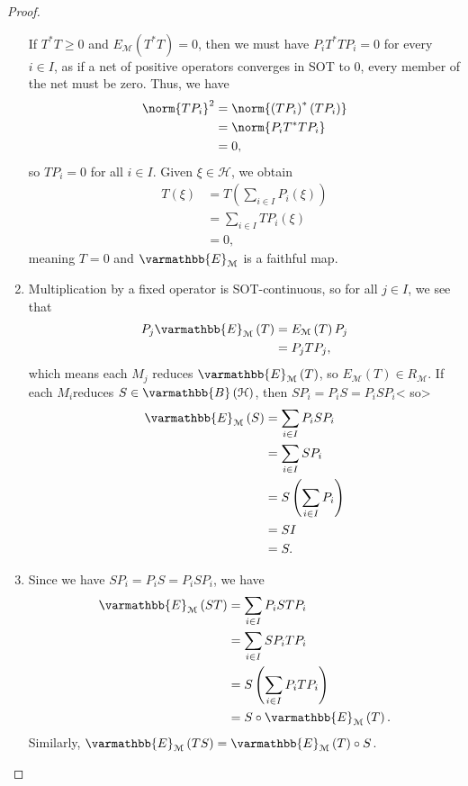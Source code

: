 \documentclass[10pt]{mypackage}
\renewcommand*{\mathbb}[1]{\varmathbb{#1}}
\newcommand{\B}{\mathbb{B}}
\begin{document}
\begin{proof}
\begin{enumerate}[(1)]
      If $T^{\ast}T \geq 0$ and $E_{\mathcal{M}}\left(T^{\ast}T\right) = 0$, then we must have $P_iT^{\ast}TP_i = 0$ for every $i\in I$, as if a net of positive operators converges in SOT to $0$, every member of the net must be zero. Thus, we have
      \begin{align*}
        \norm{TP_i}^2 &= \norm{\left(TP_i\right)^{\ast}\left(TP_i\right)}\\
                      &= \norm{P_iT^{\ast}TP_i}\\
                      &= 0,
      \end{align*}
      so $TP_i = 0$ for all $i\in I$. Given $\xi\in \mathcal{H}$, we obtain
      \begin{align*}
        T\left(\xi\right) &= T\left(\sum_{i\in I}P_i\left(\xi\right)\right)\\
                          &= \sum_{i\in I}TP_i\left(\xi\right)\\
                          &= 0,
      \end{align*}
      meaning $T = 0$ and $\mathbb{E}_{\mathcal{M}}$ is a faithful map.
    \item Multiplication by a fixed operator is SOT-continuous, so for all $j\in I$, we see that
      \begin{align*}
        P_j \mathbb{E}_{\mathcal{M}}\left(T\right) &= E_{\mathcal{M}}\left(T\right)P_{j}\\
                                                   &= P_jTP_j,
      \end{align*}
      which means each $M_j$ reduces $\mathbb{E}_{\mathcal{M}}\left(T\right)$, so $E_{\mathcal{M}}\left(T\right)\in R_{\mathcal{M}}$. If each $M_i$reduces $S\in \B\left(\mathcal{H}\right)$, then $SP_i = P_iS = P_iSP_i$< so>
      \begin{align*}
        \mathbb{E}_{\mathcal{M}}\left(S\right) &= \sum_{i\in I}P_iSP_i\\
                                               &= \sum_{i\in I}SP_i\\
                                               &= S\left(\sum_{i\in I}P_i\right)\\
                                               &= SI\\
                                               &= S.
      \end{align*}
    \item Since we have $SP_i = P_iS = P_iSP_i$, we have
      \begin{align*}
        \mathbb{E}_{\mathcal{M}}\left(ST\right) &= \sum_{i\in I}P_iSTP_i\\
                                                &= \sum_{i\in I}SP_iTP_i\\
                                                &= S\left(\sum_{i\in I}P_iTP_i\right)\\
                                                &= S\circ \mathbb{E}_{\mathcal{M}}\left(T\right).
      \end{align*}
      Similarly, $\mathbb{E}_{\mathcal{M}}\left(TS\right) = \mathbb{E}_{\mathcal{M}}\left(T\right) \circ S$.
  \end{enumerate}
\end{proof}
\end{document}
